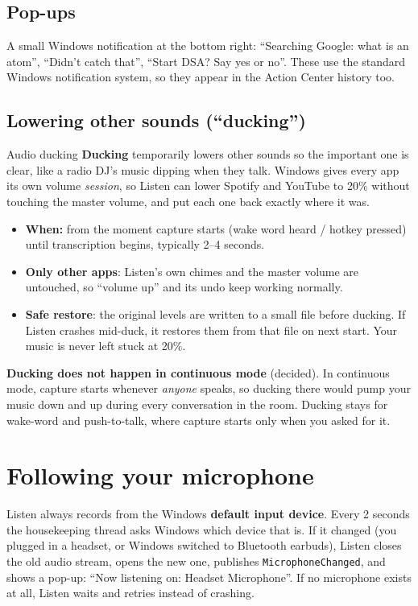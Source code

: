 \documentclass[11pt,a4paper]{article}
\begin{document}
\subsection{Pop-ups}
A small Windows notification at the bottom right: ``Searching Google: what is an atom'',
``Didn't catch that'', ``Start DSA? Say yes or no''. These use the standard Windows
notification system, so they appear in the Action Center history too.

\subsection{Lowering other sounds (``ducking'')}
\begin{concept}{Audio ducking}
\textbf{Ducking} temporarily lowers other sounds so the important one is clear, like a
radio DJ's music dipping when they talk. Windows gives every app its own volume
\emph{session}, so Listen can lower Spotify and YouTube to 20\% without touching the master
volume, and put each one back exactly where it was.
\end{concept}

\begin{itemize}[nosep]
  \item \textbf{When:} from the moment capture starts (wake word heard / hotkey pressed) until
        transcription begins, typically 2--4 seconds.
  \item \textbf{Only other apps}: Listen's own chimes and the master volume are untouched, so
        ``volume up'' and its undo keep working normally.
  \item \textbf{Safe restore}: the original levels are written to a small file before
        ducking. If Listen crashes mid-duck, it restores them from that file on next start.
        Your music is never left stuck at 20\%.
\end{itemize}

\begin{caution}
\textbf{Ducking does not happen in continuous mode} (decided). In
continuous mode, capture starts whenever \emph{anyone} speaks, so ducking there would pump your
music down and up during every conversation in the room. Ducking stays for wake-word and
push-to-talk, where capture starts only when you asked for it.
\end{caution}

\section{Following your microphone}
Listen always records from the Windows \textbf{default input device}. Every 2 seconds the
housekeeping thread asks Windows which device that is. If it changed (you plugged in a
headset, or Windows switched to Bluetooth earbuds), Listen closes the old audio stream, opens
the new one, publishes \texttt{MicrophoneChanged}, and shows a pop-up: ``Now listening on:
Headset Microphone''. If no microphone exists at all, Listen waits and retries instead of
crashing.
\end{document}
